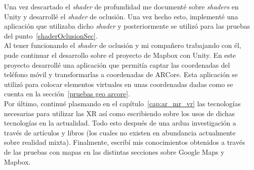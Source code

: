 Una vez descartado el \textit{shader} de profundidad me documenté sobre \textit{shaders} en Unity y desarrollé el \textit{shader} de oclusión. Una vez hecho esto, implementé una aplicación que utilizaba dicho \textit{shader} y posteriormente se utilizó para las pruebas del punto~\ref{shaderOclusionSec}.\\

Al tener funcionando el \textit{shader} de oclusión y mi compañero trabajando con él, pude continuar el desarrollo sobre el proyecto de Mapbox con Unity. En este proyecto desarrollé una aplicación que permitía captar las coordenadas del teléfono móvil y transformarlas a coordenadas de ARCore. Esta aplicación se utilizó para colocar elementos virtuales en unas coordenadas dadas como se cuenta en la sección~\ref{pruebas geo arcore}.\\

Por último, continué plasmando en el capítulo~\ref{cap:ar_mr_vr} las tecnologías necesarias para utilizar las XR así como escribiendo sobre los usos de dichas tecnologías en la actualidad. Todo esto después de una ardua investigación a través de artículos y libros (los cuales no existen en abundancia actualmente sobre realidad mixta). Finalmente, escribí mis conocimientos obtenidos a través de las pruebas con mapas en las distintas secciones sobre Google Maps y Mapbox.
